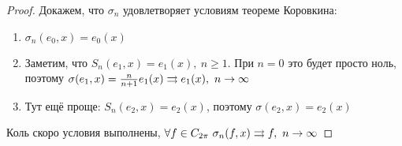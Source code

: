\begin{proof}
	Докажем, что $\sigma_n$ удовлетворяет условиям теореме Коровкина:
	\begin{enumerate}
		\item $\sigma_n(e_0, x) = e_0(x)$
		
		\item Заметим, что $S_n(e_1, x) = e_1(x),\ n \ge 1$. При $n = 0$ это будет просто ноль, поэтому $\sigma(e_1, x) = \frac{n}{n + 1}e_1(x) \rightrightarrows e_1(x),\ n \to \infty$
		
		\item Тут ещё проще: $S_n(e_2, x) = e_2(x)$, поэтому $\sigma(e_2, x) = e_2(x)$
	\end{enumerate}
	Коль скоро условия выполнены, $\forall f \in C_{2\pi}\ \sigma_n(f, x) \rightrightarrows f,\ n \to \infty$
\end{proof}